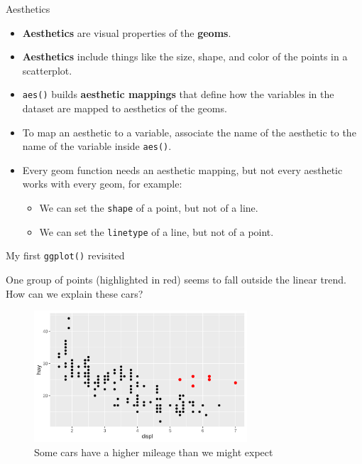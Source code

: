 \documentclass[ignorenonframetext,]{beamer}
\providecommand{\tightlist}{%
  \setlength{\itemsep}{0pt}\setlength{\parskip}{0pt}}
\begin{document}
\begin{frame}[fragile]{Aesthetics}
\protect\hypertarget{aesthetics}{}

\begin{itemize}
\item
  \textbf{Aesthetics} are visual properties of the \textbf{geoms}.
\item
  \textbf{Aesthetics} include things like the size, shape, and color of
  the points in a scatterplot.
\item
  \texttt{aes()} builds \textbf{aesthetic mappings} that define how the
  variables in the dataset are mapped to aesthetics of the geoms.
\item
  To map an aesthetic to a variable, associate the name of the aesthetic
  to the name of the variable inside \texttt{aes()}.
\item
  Every geom function needs an aesthetic mapping, but not every
  aesthetic works with every geom, for example:

  \begin{itemize}
  \tightlist
  \item
    We can set the \texttt{shape} of a point, but not of a line.
  \item
    We can set the \texttt{linetype} of a line, but not of a point.
  \end{itemize}
\end{itemize}

\end{frame}

\begin{frame}{My first \texttt{ggplot()} revisited}
\protect\hypertarget{my-first-ggplot-revisited}{}

One group of points (highlighted in red) seems to fall outside the
linear trend. How can we explain these cars?

\begin{figure}
\centering
\includegraphics[width=3.125in,height=\textheight]{figures/outl.png}
\caption{Some cars have a higher mileage than we might expect}
\end{figure}

\end{frame}
\end{document}
